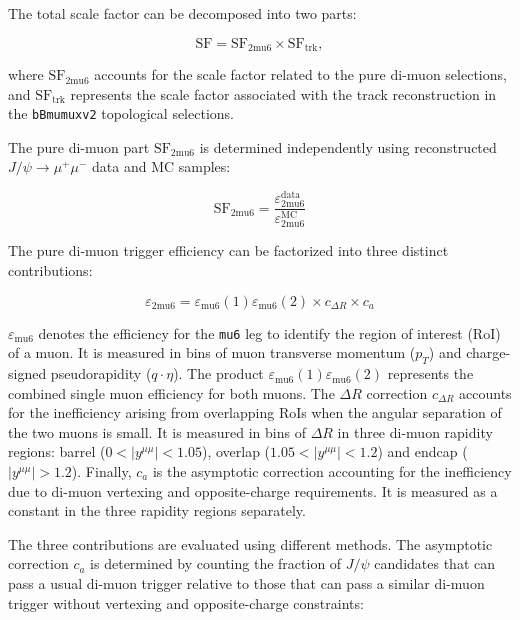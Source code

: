 The total scale factor can be decomposed into two parts:

\begin{equation}
\text{SF} = \text{SF}_{\text{2mu6}} \times \text{SF}_{\text{trk}},
\end{equation} 

where $\text{SF}_{\text{2mu6}}$ accounts for the scale factor related to the pure di-muon selections, and $\text{SF}_{\text{trk}}$ represents the scale factor associated with the track reconstruction in the \texttt{bBmumuxv2} topological selections.

The pure di-muon part $\text{SF}_{\text{2mu6}}$ is determined independently using reconstructed $J/\psi \to \mu^+\mu^-$ data and MC samples:

\begin{equation}
\text{SF}_{\text{2mu6}} = \dfrac{\varepsilon^{\text{data}}_{\text{2mu6}}}{\varepsilon^{\text{MC}}_{\text{2mu6}}}
\end{equation}

The pure di-muon trigger efficiency can be factorized into three distinct contributions:

\begin{equation}
\varepsilon_{\text{2mu6}} = \varepsilon_{\text{mu6}}(1)\varepsilon_{\text{mu6}}(2)\times c_{\Delta R} \times c_a
\end{equation}

$\varepsilon_{\text{mu6}}$ denotes the efficiency for the \texttt{mu6} leg to identify the region of interest (RoI) of a muon. It is measured in bins of muon transverse momentum ($p_T$) and charge-signed pseudorapidity ($q\cdot\eta$). The product $\varepsilon_{\text{mu6}}(1)\varepsilon_{\text{mu6}}(2)$ represents the combined single muon efficiency for both muons. The $\Delta R$ correction $c_{\Delta R}$ accounts for the inefficiency arising from overlapping RoIs when the angular separation of the two muons is small. It is measured in bins of $\Delta R$ in three di-muon rapidity regions: barrel ($0 < |y^{\mu\mu}| < 1.05$), overlap ($1.05 < |y^{\mu\mu}| < 1.2$) and endcap ($|y^{\mu\mu}| > 1.2$). Finally, $c_a$ is the asymptotic correction accounting for the inefficiency due to di-muon vertexing and opposite-charge requirements. It is measured as a constant in the three rapidity regions separately. 

The three contributions are evaluated using different methods. The asymptotic correction $c_a$ is determined by counting the fraction of $J/\psi$ candidates that can pass a usual di-muon trigger relative to those that can pass a similar di-muon trigger without vertexing and opposite-charge constraints:

